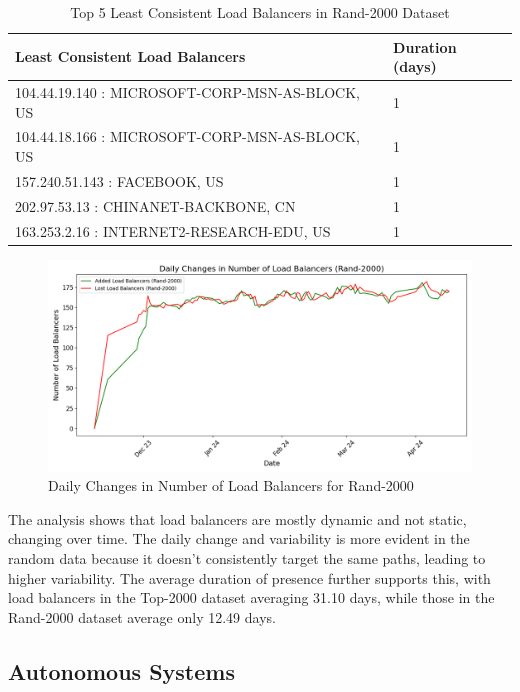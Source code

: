 \documentclass[12pt]{cwru_thesis}
\begin{document}
\begin{table}[h!]
    \centering
    \begin{tabular}{|l|l|}
        \hline
        \textbf{Least Consistent Load Balancers} & \textbf{Duration (days)} \\ \hline
        104.44.19.140 : MICROSOFT-CORP-MSN-AS-BLOCK, US & 1 \\ \hline
        104.44.18.166 : MICROSOFT-CORP-MSN-AS-BLOCK, US & 1 \\ \hline
        157.240.51.143 : FACEBOOK, US & 1 \\ \hline
        202.97.53.13 : CHINANET-BACKBONE, CN & 1 \\ \hline
        163.253.2.16 : INTERNET2-RESEARCH-EDU, US & 1 \\ \hline
    \end{tabular}
    \caption{Top 5 Least Consistent Load Balancers in Rand-2000 Dataset}
\end{table}

\begin{figure}[h!]
    \centering
    \includegraphics[width=\linewidth]{figures/load_balancer_changes_Rand-2000.png}
    \caption{Daily Changes in Number of Load Balancers for Rand-2000}
    \label{fig:rand2000_changes}
\end{figure}

The analysis shows that load balancers are mostly dynamic and not static, changing over time. The daily change and variability is more evident in the random data because it doesn't consistently target the same paths, leading to higher variability. The average duration of presence further supports this, with load balancers in the Top-2000 dataset averaging 31.10 days, while those in the Rand-2000 dataset average only 12.49 days. 


\subsection{Autonomous Systems}
\end{document}
